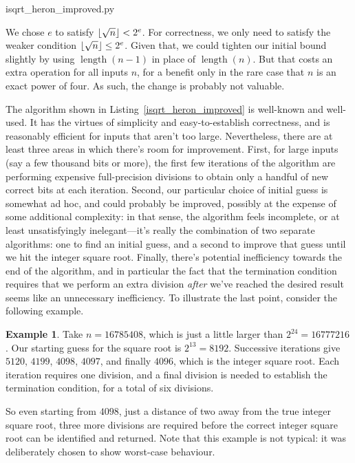 \documentclass[a4paper]{article}
\DeclarePairedDelimiter\floor{\lfloor}{\rfloor}
\DeclareMathOperator{\length}{length}
\theoremstyle{plain}
\theoremstyle{definition}
\newtheorem{example}[theorem]{Example}
\begin{document}

  {isqrt_heron_improved.py}

We chose $e$ to satisfy $\floor{\sqrt n} < 2^e$. For correctness, we only need
to satisfy the weaker condition $\floor{\sqrt n} \le 2^e$. Given that, we could
tighten our initial bound slightly by using $\length(n-1)$ in place of
$\length(n)$. But that costs an extra operation for all inputs $n$, for a
benefit only in the rare case that $n$ is an exact power of four. As such, the
change is probably not valuable.

The algorithm shown in Listing~\ref{isqrt_heron_improved} is well-known and
well-used. It has the virtues of simplicity and easy-to-establish correctness,
and is reasonably efficient for inputs that aren't too large. Nevertheless,
there are at least three areas in which there's room for improvement. First,
for large inputs (say a few thousand bits or more), the first few iterations of
the algorithm are performing expensive full-precision divisions to obtain only
a handful of new correct bits at each iteration. Second, our particular choice
of initial guess is somewhat ad hoc, and could probably be improved, possibly
at the expense of some additional complexity: in that sense, the algorithm
feels incomplete, or at least unsatisfyingly inelegant---it's really the
combination of two separate algorithms: one to find an initial guess, and a
second to improve that guess until we hit the integer square root. Finally,
there's potential inefficiency towards the end of the algorithm, and in
particular the fact that the termination condition requires that we perform an
extra division \emph{after} we've reached the desired result seems like an
unnecessary inefficiency. To illustrate the last point, consider the following
example.

\begin{example}
  Take $n = 16785408$, which is just a little larger than $2^{24} = 16777216$.
  Our starting guess for the square root is $2^{13} = 8192$. Successive
  iterations give $5120$, $4199$, $4098$, $4097$, and finally $4096$, which
  is the integer square root. Each iteration requires one division, and
  a final division is needed to establish the termination condition, for
  a total of six divisions.
\end{example}

So even starting from $4098$, just a distance of two away from the true integer
square root, three more divisions are required before the correct integer
square root can be identified and returned. Note that this example is not
typical: it was deliberately chosen to show worst-case behaviour.
\end{document}
